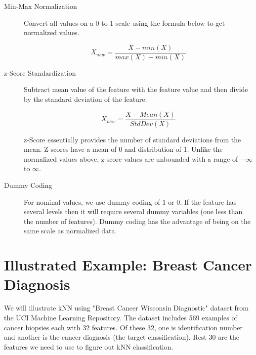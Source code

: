 \documentclass[11pt, letterpaper, twoside]{memoir}\usepackage{knitr}
\begin{document}
\begin{description}

\item [Min-Max Normalization] Convert all values on a 0 to 1 scale using the formula below to get normalized values.

\[X_{new} = \frac{X - min(X)}{max(X) - min(X)}   \]

\item [z-Score Standardization] Subtract mean value of the feature with the feature value and then divide by the standard deviation of the feature.

\[X_{new} = \frac{X - Mean(X)}{StdDev(X)} \]

z-Score essentially provides the number of standard deviations from the mean. Z-scores have a mean of 0 and distribution of 1. Unlike the normalized values above, z-score values are unbounded with a range of $-\infty$ to $\infty$.

\item [Dummy Coding] For nominal values, we use dummy coding of 1 or 0. If the feature has several levels then it will require several dummy variables (one less than the number of features). Dummy coding has the advantage of being on the same scale as normalized data.
\end{description}

\section{Illustrated Example: Breast Cancer Diagnosis}

We will illustrate kNN using "Breast Cancer Wisconsin Diagnostic" dataset from the UCI Machine Learning Repository. The dataset includes 569 examples of cancer biopsies each with 32 features. Of these 32, one is identification number and another is the cancer diagnosis (the target classification). Rest 30 are the features we need to use to figure out kNN classification.

\begin{knitrout}
\color{fgcolor}\begin{kframe}
\begin{alltt}
 \hlkwb{<-} \hlstd{(}\hlstd{,}  \hlstd{=} \hlstd{)}
\end{alltt}
\end{kframe}
\end{knitrout}
\end{document}
